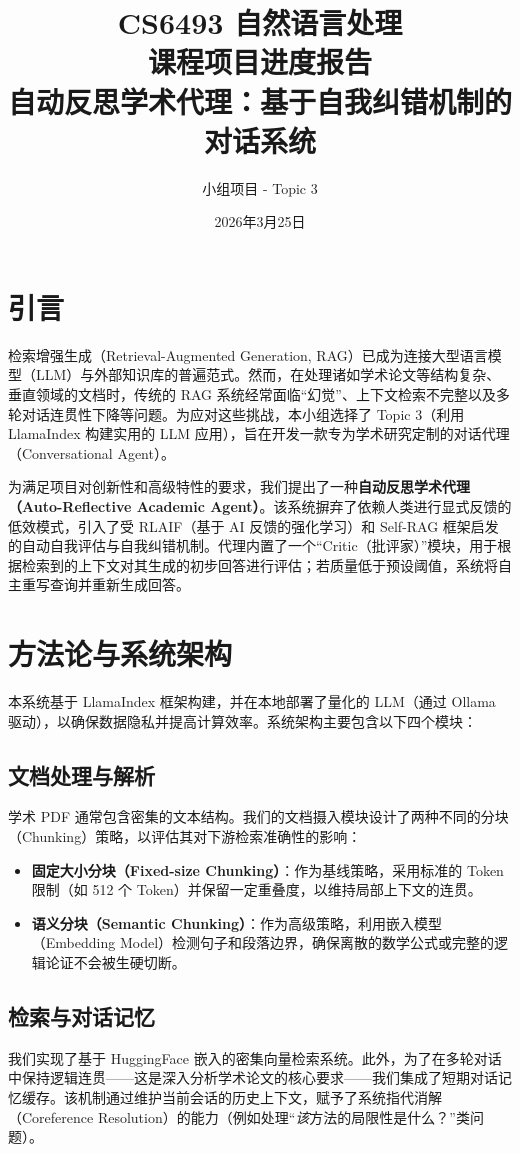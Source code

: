 \documentclass[11pt,a4paper]{article}
\title{CS6493 自然语言处理 \\ 课程项目进度报告 \\ \large 自动反思学术代理：基于自我纠错机制的对话系统}
\author{小组项目 - Topic 3}
\date{2026年3月25日}
\begin{document}
\maketitle

\section{引言}
检索增强生成（Retrieval-Augmented Generation, RAG）已成为连接大型语言模型（LLM）与外部知识库的普遍范式。然而，在处理诸如学术论文等结构复杂、垂直领域的文档时，传统的 RAG 系统经常面临“幻觉”、上下文检索不完整以及多轮对话连贯性下降等问题。为应对这些挑战，本小组选择了 Topic 3（利用 LlamaIndex 构建实用的 LLM 应用），旨在开发一款专为学术研究定制的对话代理（Conversational Agent）。

为满足项目对创新性和高级特性的要求，我们提出了一种\textbf{自动反思学术代理（Auto-Reflective Academic Agent）}。该系统摒弃了依赖人类进行显式反馈的低效模式，引入了受 RLAIF（基于 AI 反馈的强化学习）和 Self-RAG 框架启发的自动自我评估与自我纠错机制。代理内置了一个“Critic（批评家）”模块，用于根据检索到的上下文对其生成的初步回答进行评估；若质量低于预设阈值，系统将自主重写查询并重新生成回答。

\section{方法论与系统架构}
本系统基于 LlamaIndex 框架构建，并在本地部署了量化的 LLM（通过 Ollama 驱动），以确保数据隐私并提高计算效率。系统架构主要包含以下四个模块：

\subsection{文档处理与解析}
学术 PDF 通常包含密集的文本结构。我们的文档摄入模块设计了两种不同的分块（Chunking）策略，以评估其对下游检索准确性的影响：
\begin{itemize}
    \item \textbf{固定大小分块（Fixed-size Chunking）}：作为基线策略，采用标准的 Token 限制（如 512 个 Token）并保留一定重叠度，以维持局部上下文的连贯。
    \item \textbf{语义分块（Semantic Chunking）}：作为高级策略，利用嵌入模型（Embedding Model）检测句子和段落边界，确保离散的数学公式或完整的逻辑论证不会被生硬切断。
\end{itemize}

\subsection{检索与对话记忆}
我们实现了基于 HuggingFace 嵌入的密集向量检索系统。此外，为了在多轮对话中保持逻辑连贯——这是深入分析学术论文的核心要求——我们集成了短期对话记忆缓存。该机制通过维护当前会话的历史上下文，赋予了系统指代消解（Coreference Resolution）的能力（例如处理“\textit{该}方法的局限性是什么？”类问题）。
\end{document}
